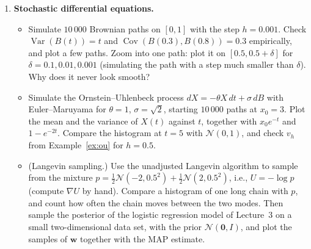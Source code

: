\documentclass[11pt]{article}
\DeclareMathOperator{\Var}{Var}
\DeclareMathOperator{\Cov}{Cov}
\theoremstyle{definition}
\theoremstyle{plain}
\theoremstyle{remark}
\begin{document}
\begin{enumerate}[label=\textbf{P\arabic*.}, leftmargin=*]
    \item \textbf{Stochastic differential equations.}
    \begin{itemize}
        \item Simulate $10\,000$ Brownian paths on $[0, 1]$ with the step $h = 0.001$. Check $\Var(B(t)) = t$ and $\Cov(B(0.3), B(0.8)) = 0.3$ empirically, and plot a few paths. Zoom into one path: plot it on $[0.5, 0.5 + \delta]$ for $\delta = 0.1, 0.01, 0.001$ (simulating the path with a step much smaller than $\delta$). Why does it never look smooth?
        \item Simulate the Ornstein--Uhlenbeck process $dX = -\theta X\,dt + \sigma\,dB$ with Euler--Maruyama for $\theta = 1$, $\sigma = \sqrt{2}$, starting $10\,000$ paths at $x_0 = 3$. Plot the mean and the variance of $X(t)$ against $t$, together with $x_0e^{-t}$ and $1 - e^{-2t}$. Compare the histogram at $t = 5$ with $\mathcal{N}(0, 1)$, and check $v_h$ from Example~\ref{ex:ou} for $h = 0.5$.
        \item (Langevin sampling.) Use the unadjusted Langevin algorithm to sample from the mixture $p = \frac{1}{2}\mathcal{N}(-2, 0.5^2) + \frac{1}{2}\mathcal{N}(2, 0.5^2)$, i.e., $U = -\log p$ (compute $\nabla U$ by hand). Compare a histogram of one long chain with $p$, and count how often the chain moves between the two modes. Then sample the posterior of the logistic regression model of Lecture~3 on a small two-dimensional data set, with the prior $\mathcal{N}(\mathbf{0}, I)$, and plot the samples of $\mathbf{w}$ together with the MAP estimate.
    \end{itemize}

\end{enumerate}
\end{document}
